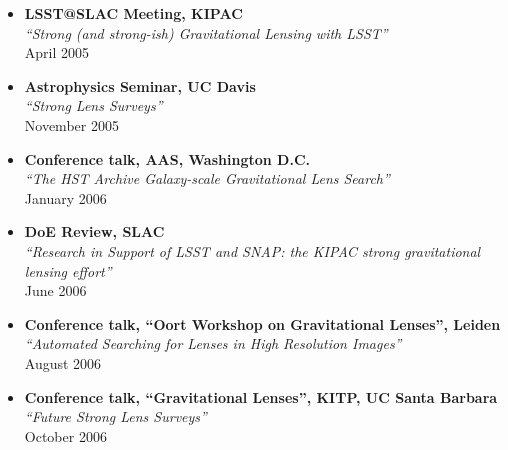 \begin{itemize}
\item{\textbf{LSST@SLAC Meeting, KIPAC}\\
\textit{``Strong (and strong-ish) Gravitational Lensing with LSST''}\\
April 2005
}

\item{\textbf{Astrophysics Seminar, UC Davis}\\
\textit{``Strong Lens Surveys''}\\
November 2005
}

\item{\textbf{Conference talk, AAS, Washington D.C.}\\
\textit{``The HST Archive Galaxy-scale Gravitational Lens Search''}\\
January 2006
}

\item{\textbf{DoE Review, SLAC}\\
\textit{``Research in Support of LSST and SNAP: the KIPAC strong gravitational lensing effort''}\\	
June 2006
}

\item{\textbf{Conference talk, ``Oort Workshop on Gravitational Lenses'', Leiden}\\
\textit{``Automated Searching for Lenses in High Resolution Images''}\\
August 2006
}

\item{\textbf{Conference talk, ``Gravitational Lenses'', KITP, UC Santa Barbara}\\
\textit{``Future Strong Lens Surveys''}\\
October 2006
}

\end{itemize}

